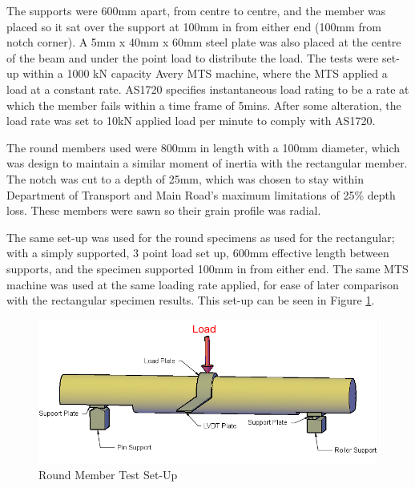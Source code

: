 \documentclass[11pt,a4paper]{article}
\numberwithin{equation}{subsection}
\begin{document}
\noindent
The supports were 600mm apart, from centre to centre, and the member was placed so it sat over the support at 100mm in from either end (100mm from notch corner). A 5mm x 40mm x 60mm steel plate was also placed at the centre of the beam and under the point load to distribute the load. The tests were set-up within a 1000 kN capacity Avery MTS machine, where the MTS applied a load at a constant rate. AS1720 specifies instantaneous load rating to be a rate at which the member fails within a time frame of 5mins. After some alteration, the load rate was set to 10kN applied load per minute to comply with AS1720. 


\noindent
The round members used were 800mm in length with a 100mm diameter, which was design to maintain a similar moment of inertia with the rectangular member. The notch was cut to a depth of 25mm, which was chosen to stay within Department of Transport and Main Road's maximum limitations of 25\% depth loss. These members were sawn so their grain profile was radial. 

\vspace*{\baselineskip}

\noindent
The same set-up was used for the round specimens as used for the rectangular; with a simply supported, 3 point load set up, 600mm effective length between supports, and the specimen supported 100mm in from either end. The same MTS machine was used at the same loading rate applied, for ease of later comparison with the rectangular specimen results. This set-up can be seen in Figure \ref{fig:round}.


\begin{figure}[h]
	\begin{center}
		\includegraphics[scale=0.55]{Circular_Setup}
	\end{center}
	\caption{Round Member Test Set-Up}
	\label{fig:round}
\end{figure}
\end{document}
